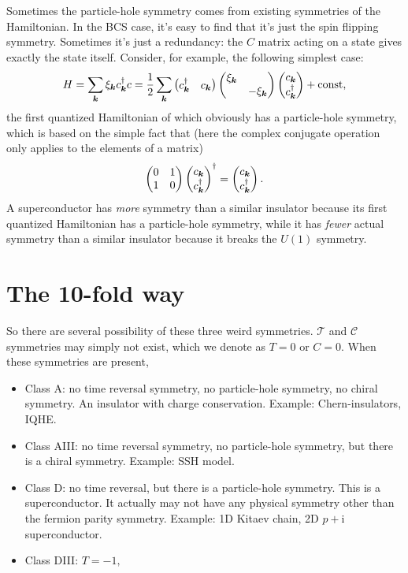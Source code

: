 \documentclass[hyperref, a4paper]{article}
\newcommand*{\ii}{\mathrm{i}}
\begin{document}
Sometimes the particle-hole symmetry comes from existing symmetries of the Hamiltonian. In the 
BCS case, it's easy to find that it's just the spin flipping symmetry.
Sometimes it's just a redundancy: the $C$ matrix acting on a state gives exactly the state itself.
Consider, for example, the following simplest case:
\begin{equation}
    H = \sum_{\vb*{k}} \xi_{\vb*{k}} c^\dagger_{\vb*{k}} c = \frac{1}{2} \sum_{\vb*{k}} \pmqty{c^\dagger_{\vb*{k}} & c_{\vb*{k}} } \pmqty{\dmat{\xi_{\vb*{k}}, - \xi_{\vb*{k}}}} \pmqty{c_{\vb*{k}} \\ c^\dagger_{\vb*{k}}} + \text{const},
\end{equation}
the first quantized Hamiltonian of which obviously has a particle-hole symmetry, which is based on the simple 
fact that (here the complex conjugate operation only applies to the elements of a matrix)
\[
    \pmqty{0 & 1 \\ 1 & 0} \pmqty{c_{\vb*{k}} \\ c^\dagger_{\vb*{k}}}^\dagger = \pmqty{c_{\vb*{k}} \\ c^\dagger_{\vb*{k}}}.
\]
A superconductor has \emph{more} symmetry than a similar insulator 
because its first quantized Hamiltonian has a particle-hole symmetry, while it has \emph{fewer} actual symmetry than a similar 
insulator because it breaks the $U(1)$ symmetry. 

\section{The 10-fold way}

So there are several possibility of these three weird symmetries. $\mathcal{T}$ and $\mathcal{C}$ symmetries 
may simply not exist, which we denote as ${T} = 0$ or ${C} = 0$. When these symmetries are present,


\begin{itemize}
    \item Class A: no time reversal symmetry, no particle-hole symmetry, no chiral symmetry. An insulator with
    charge conservation. Example: Chern-insulators, IQHE.
    \item Class AIII: no time reversal symmetry, no particle-hole symmetry, but there is a chiral symmetry. 
    Example: SSH model. 
    \item Class D: no time reversal, but there is a particle-hole symmetry. This is a superconductor.
    It actually may not have any physical symmetry other than the fermion parity symmetry.
    Example: 1D Kitaev chain, 2D $p + \ii $ superconductor.
    \item Class DIII: $T=-1, $
\end{itemize}
\end{document}
